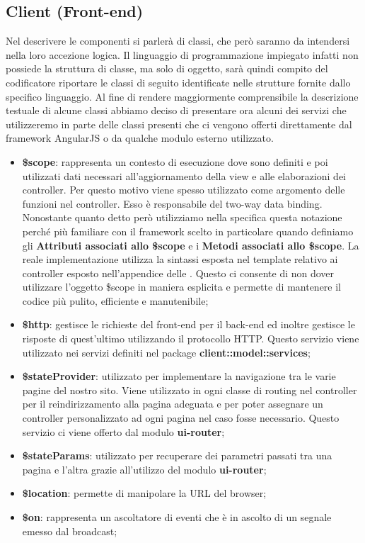 \subsection{Client (Front-end)} %
\label{sub:client}
Nel descrivere le componenti si parlerà di classi, che però saranno da intendersi nella loro accezione logica. Il linguaggio di programmazione impiegato infatti non possiede la struttura di classe, ma solo di oggetto, sarà quindi compito del codificatore riportare le classi di seguito identificate nelle strutture fornite dallo specifico linguaggio. \newline
Al fine di rendere maggiormente comprensibile la descrizione testuale di alcune classi abbiamo deciso di presentare ora alcuni dei servizi che utilizzeremo in parte delle classi presenti che ci vengono offerti direttamente dal framework AngularJS o da qualche modulo esterno utilizzato.
	\begin{itemize}
		\item \textbf{\$scope}: rappresenta un contesto di esecuzione dove sono definiti e poi utilizzati dati necessari all'aggiornamento della view e alle elaborazioni dei controller. Per questo motivo viene spesso utilizzato come argomento delle funzioni nel controller. Esso è responsabile del two-way data binding. \newline
		Nonostante quanto detto però utilizziamo nella specifica questa notazione perché più familiare con il framework scelto in particolare quando definiamo gli \textbf{Attributi associati allo \$scope} e i \textbf{Metodi associati allo \$scope}. La reale implementazione utilizza la sintassi esposta nel template relativo ai controller esposto nell'appendice delle \docNameVersionNdP. Questo ci consente di non dover utilizzare l'oggetto \$scope in maniera esplicita e permette di mantenere il codice più pulito, efficiente e manutenibile;

		\item \textbf{\$http}: gestisce le richieste del front-end per il back-end ed inoltre gestisce le risposte di quest'ultimo utilizzando il protocollo HTTP. Questo servizio viene utilizzato nei servizi definiti nel package \textbf{client::model::services};
		\item \textbf{\$stateProvider}: utilizzato per implementare la navigazione tra le varie pagine del nostro sito. Viene utilizzato in ogni classe di routing nel controller per il reindirizzamento alla pagina adeguata e per poter assegnare un controller personalizzato ad ogni pagina nel caso fosse necessario. Questo servizio ci viene offerto dal modulo \textbf{ui-router};
		\item \textbf{\$stateParams}: utilizzato per recuperare dei parametri passati tra una pagina e l'altra grazie all'utilizzo del modulo \textbf{ui-router};
		\item \textbf{\$location}: permette di manipolare la URL del browser;
		\item \textbf{\$on}: rappresenta un ascoltatore di eventi che è in ascolto di un segnale emesso dal broadcast;
	\end{itemize}


